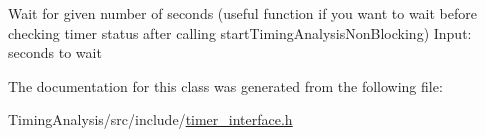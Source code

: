 Wait for given number of seconds (useful function if you want to wait before checking timer status after calling start\-Timing\-Analysis\-Non\-Blocking) Input\-: seconds to wait 

The documentation for this class was generated from the following file\-:\begin{DoxyCompactItemize}
\item 
Timing\-Analysis/src/include/\hyperlink{timer__interface_8h}{timer\-\_\-interface.\-h}\end{DoxyCompactItemize}
